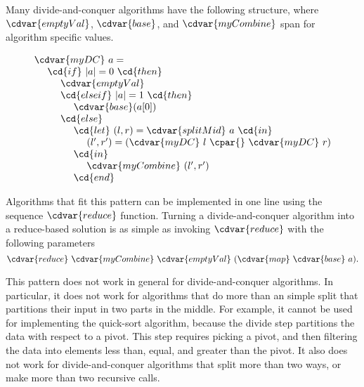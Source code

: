 \begin{gram}
Many divide-and-conquer algorithms have the following structure, where
$\cdvar{emptyVal}$, $\cdvar{base}$, and $\cdvar{myCombine}$ span for algorithm
specific values.

\[
\begin{array}{l}
\cdvar{myDC}~a =
\\ 
~~~~\cd{if}~|a| = 0 ~\cd{then}
\\
~~~~~~~~\cdvar{emptyVal}
\\
~~~~~~~~\cd{else if}~|a| = 1 ~\cd{then}
\\
~~~~~~~~~~~~\cdvar{base}(a[0])
\\
~~~~~~~~\cd{else}
\\
~~~~~~~~~~~~\cd{let}~(l,r) = \cdvar{splitMid}~a~\cd{in}
\\
~~~~~~~~~~~~~~~~(l',r') = (\cdvar{myDC}~l~\cpar{}~\cdvar{myDC}~r)
\\
~~~~~~~~~~~~\cd{in}
\\
~~~~~~~~~~~~~~~~\cdvar{myCombine}~(l', r')
\\
~~~~~~~~~~~~\cd{end}
\end{array}
\]

Algorithms that fit this pattern can be implemented in one line using
the sequence $\cdvar{reduce}$ function.
%
Turning a divide-and-conquer algorithm into a reduce-based solution is
as simple as invoking $\cdvar{reduce}$ with the following parameters
\[
\cdvar{reduce}~\cdvar{myCombine}~\cdvar{emptyVal}~(\cdvar{map}~\cdvar{base}~a).
\]
\end{gram}

\begin{important}
This pattern does not work in general for divide-and-conquer
algorithms.  In particular, it does not work for algorithms that do
more than an simple split that partitions their input in two parts in
the middle.  
%
For example, it cannot be used for implementing the quick-sort
algorithm, because the divide step partitions the data with respect to
a pivot.  
%
This step requires picking a pivot, and then filtering the
data into elements less than, equal, and greater than the pivot.  
%
It also does not work for divide-and-conquer algorithms that split
more than two ways, or make more than two recursive calls.
\end{important}

